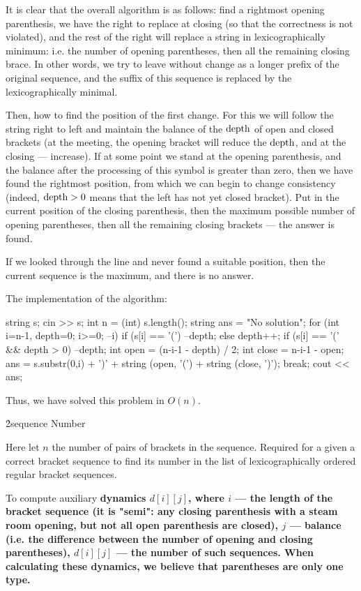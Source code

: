 It is clear that the overall algorithm is as follows: find a rightmost opening parenthesis, we have the right to replace at closing (so that the correctness is not violated), and the rest of the right will replace a string in lexicographically minimum: i.e. the number of opening parentheses, then all the remaining closing brace. In other words, we try to leave without change as a longer prefix of the original sequence, and the suffix of this sequence is replaced by the lexicographically minimal.

Then, how to find the position of the first change. For this we will follow the string right to left and maintain the balance of the $\rm depth$ of open and closed brackets (at the meeting, the opening bracket will reduce the $\rm depth$, and at the closing --- increase). If at some point we stand at the opening parenthesis, and the balance after the processing of this symbol is greater than zero, then we have found the rightmost position, from which we can begin to change consistency (indeed, $\rm depth > 0$ means that the left has not yet closed bracket). Put in the current position of the closing parenthesis, then the maximum possible number of opening parentheses, then all the remaining closing brackets --- the answer is found.

If we looked through the line and never found a suitable position, then the current sequence is the maximum, and there is no answer.

The implementation of the algorithm:

\code
string s;
cin >> s;
int n = (int) s.length();
string ans = "No solution";
for (int i=n-1, depth=0; i>=0; --i) {
if (s[i] == '(')
--depth;
else
depth++;
if (s[i] == '(' && depth > 0) {
--depth;
int open = (n-i-1 - depth) / 2;
int close = n-i-1 - open;
ans = s.substr(0,i) + ')' + string (open, '(') + string (close, ')');
break;
}
}
cout << ans;
\endcode

Thus, we have solved this problem in $O(n)$.


\h2{sequence Number}

Here let $n$ the number of pairs of brackets in the sequence. Required for a given a correct bracket sequence to find its number in the list of lexicographically ordered regular bracket sequences.

To compute auxiliary \bf{dynamics} $d[i][j]$, where $i$ --- the length of the bracket sequence (it is "semi": any closing parenthesis with a steam room opening, but not all open parenthesis are closed), $j$ --- balance (i.e. the difference between the number of opening and closing parentheses), $d[i][j]$ --- the number of such sequences. When calculating these dynamics, we believe that parentheses are only one type.

